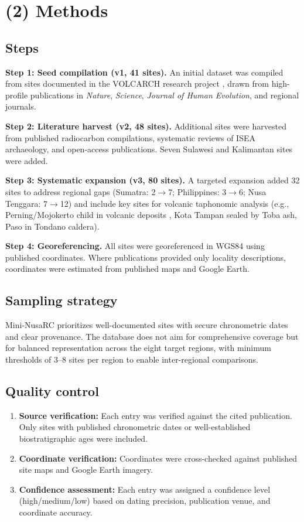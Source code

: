 \documentclass[11pt]{article}
\begin{document}
\section{(2) Methods}

\subsection{Steps}

\textbf{Step 1: Seed compilation (v1, 41 sites).} An initial dataset was compiled from sites documented in the VOLCARCH research project \citep{amien2026taphonomic}, drawn from high-profile publications in \textit{Nature}, \textit{Science}, \textit{Journal of Human Evolution}, and regional journals.

\textbf{Step 2: Literature harvest (v2, 48 sites).} Additional sites were harvested from published radiocarbon compilations, systematic reviews of ISEA archaeology, and open-access publications. Seven Sulawesi and Kalimantan sites were added.

\textbf{Step 3: Systematic expansion (v3, 80 sites).} A targeted expansion added 32 sites to address regional gaps (Sumatra: 2$\rightarrow$7; Philippines: 3$\rightarrow$6; Nusa Tenggara: 7$\rightarrow$12) and include key sites for volcanic taphonomic analysis (e.g., Perning/Mojokerto child in volcanic deposits \citep{swisher1994mojokerto}, Kota Tampan sealed by Toba ash, Paso in Tondano caldera).

\textbf{Step 4: Georeferencing.} All sites were georeferenced in WGS84 using published coordinates. Where publications provided only locality descriptions, coordinates were estimated from published maps and Google Earth.

\subsection{Sampling strategy}

Mini-NusaRC prioritizes well-documented sites with secure chronometric dates and clear provenance. The database does not aim for comprehensive coverage but for balanced representation across the eight target regions, with minimum thresholds of 3--8 sites per region to enable inter-regional comparisons.

\subsection{Quality control}

\begin{enumerate}
    \item \textbf{Source verification:} Each entry was verified against the cited publication. Only sites with published chronometric dates or well-established biostratigraphic ages were included.
    \item \textbf{Coordinate verification:} Coordinates were cross-checked against published site maps and Google Earth imagery.
    \item \textbf{Confidence assessment:} Each entry was assigned a confidence level (high/medium/low) based on dating precision, publication venue, and coordinate accuracy.
\end{enumerate}
\end{document}
